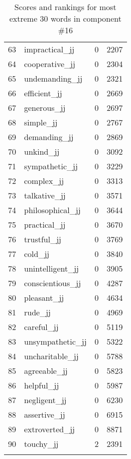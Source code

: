 \begin{longtable}[!htbp]{| rlr@{.}l |}
    63 & impractical\_jj & 0 & 2207 \\
    64 & cooperative\_jj & 0 & 2304 \\
    65 & undemanding\_jj & 0 & 2321 \\
    66 & efficient\_jj & 0 & 2669 \\
    67 & generous\_jj & 0 & 2697 \\
    68 & simple\_jj & 0 & 2767 \\
    69 & demanding\_jj & 0 & 2869 \\
    70 & unkind\_jj & 0 & 3092 \\
    71 & sympathetic\_jj & 0 & 3229 \\
    72 & complex\_jj & 0 & 3313 \\
    73 & talkative\_jj & 0 & 3571 \\
    74 & philosophical\_jj & 0 & 3644 \\
    75 & practical\_jj & 0 & 3670 \\
    76 & trustful\_jj & 0 & 3769 \\
    77 & cold\_jj & 0 & 3840 \\
    78 & unintelligent\_jj & 0 & 3905 \\
    79 & conscientious\_jj & 0 & 4287 \\
    80 & pleasant\_jj & 0 & 4634 \\
    81 & rude\_jj & 0 & 4969 \\
    82 & careful\_jj & 0 & 5119 \\
    83 & unsympathetic\_jj & 0 & 5322 \\
    84 & uncharitable\_jj & 0 & 5788 \\
    85 & agreeable\_jj & 0 & 5823 \\
    86 & helpful\_jj & 0 & 5987 \\
    87 & negligent\_jj & 0 & 6230 \\
    88 & assertive\_jj & 0 & 6915 \\
    89 & extroverted\_jj & 0 & 8871 \\
    90 & touchy\_jj & 2 & 2391 \\
    \hline
    \caption{Scores and rankings for most extreme 30 words in component \#16} \\
\end{longtable}
